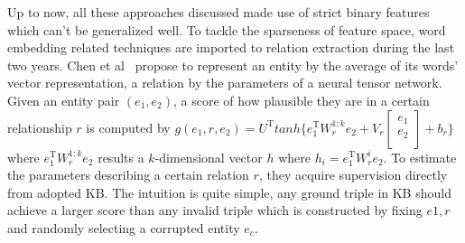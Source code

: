 \documentclass[10pt]{article} %
\theoremstyle{definition}
\theoremstyle{definition}
\begin{document}
Up to now, all these approaches discussed made use of strict binary features which can't be generalized well. 
To tackle the sparseness of feature space, word embedding related techniques are imported to relation extraction during the last two years. 
Chen et al~\cite{cdq} propose to represent an entity by the average of its words' vector representation, a relation by the parameters of a neural tensor network. 
Given an entity pair $(e_1, e_2)$, a score of how plausible they are in a certain relationship $r$ is computed by 
$g(e_1, r, e_2)=U^{\mathrm{T}}tanh\{e_{1}^{\mathrm{T}}W_{r}^{1:k}e_2+V_{r}\begin{bmatrix}e_1\\e_2\\\end{bmatrix}+b_{r}\}$ where 
$e_{1}^{\mathrm{T}}W_{r}^{1:k}e_{2}$ results a $k$-dimensional vector $h$ where 
$h_{i}=e_{1}^{\mathrm{T}}W_{r}^{i}e_2$. 
To estimate the parameters describing a certain relation $r$, they acquire supervision directly from adopted KB. 
The intuition is quite simple, any ground triple in KB should achieve a larger score than any invalid triple which 
is constructed by fixing $e1, r$ and randomly selecting a corrupted entity $e_c$. 



\end{document}
